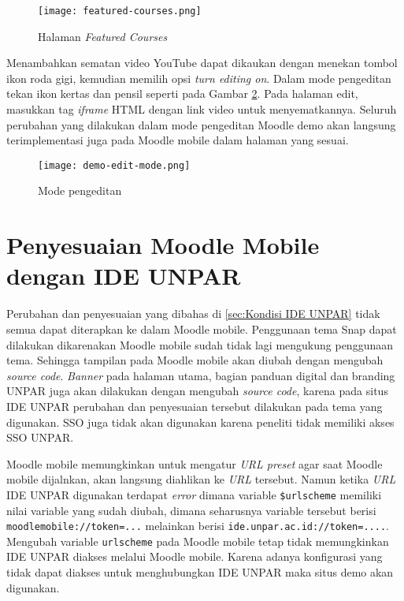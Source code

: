 \begin{figure}[H] 
	\centering  
	\texttt{[image: featured-courses.png]}  
	\caption[Halaman \textit{Featured Courses}] {Halaman \textit{Featured Courses}} 
	\label{fig:featured courses} 
\end{figure} 


Menambahkan sematan video YouTube dapat dikaukan dengan menekan tombol ikon roda gigi, kemudian memilih opsi \textit{turn editing on}. Dalam mode pengeditan tekan ikon kertas dan pensil seperti pada Gambar \ref{fig:editingmode}. Pada halaman edit, masukkan tag \textit{iframe} HTML dengan link video untuk menyematkannya. Seluruh perubahan yang dilakukan dalam mode pengeditan Moodle demo akan langsung terimplementasi juga pada Moodle mobile dalam halaman yang sesuai.

\begin{figure}[H] 
	\centering  
	\texttt{[image: demo-edit-mode.png]}  
	\caption[Mode pengeditan] {Mode pengeditan} 
	\label{fig:editingmode} 
\end{figure} 

\section{Penyesuaian Moodle Mobile dengan IDE UNPAR}
Perubahan dan penyesuaian yang dibahas di \ref{sec:Kondisi IDE UNPAR} tidak semua dapat diterapkan ke dalam Moodle mobile. Penggunaan tema Snap dapat dilakukan dikarenakan Moodle mobile sudah tidak lagi mengukung penggunaan tema. Sehingga tampilan pada Moodle mobile akan diubah dengan mengubah \textit{source code}. \textit{Banner} pada halaman utama, bagian panduan digital dan branding UNPAR juga akan dilakukan dengan mengubah \textit{source code}, karena pada situs IDE UNPAR perubahan dan penyesuaian tersebut dilakukan pada tema yang digunakan. SSO juga tidak akan digunakan karena peneliti tidak memiliki akses SSO UNPAR.

Moodle mobile memungkinkan untuk mengatur \textit{URL preset} agar saat Moodle mobile dijalnkan, akan langsung diahlikan ke \textit{URL} tersebut. Namun ketika \textit{URL} IDE UNPAR digunakan terdapat \textit{error} dimana variable \texttt{\$urlscheme} memiliki nilai variable yang sudah diubah, dimana seharusnya variable tersebut berisi \texttt{moodlemobile://token=...} melainkan berisi \texttt{ide.unpar.ac.id://token=....}. Mengubah variable \texttt{urlscheme} pada Moodle mobile tetap tidak memungkinkan  IDE UNPAR diakses melalui Moodle mobile. Karena  adanya konfigurasi yang tidak dapat diakses untuk menghubungkan IDE UNPAR maka situs demo akan digunakan.

